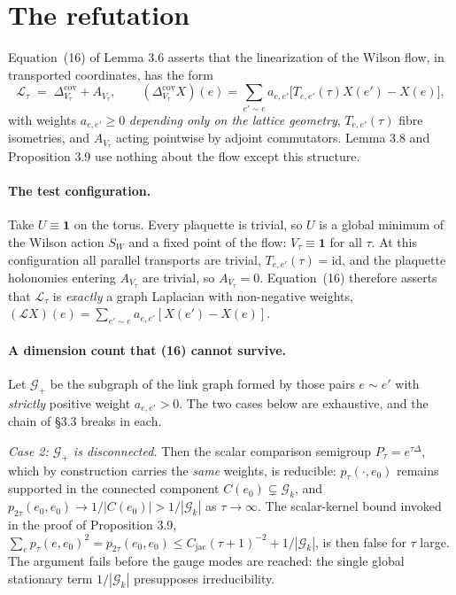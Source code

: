 \documentclass[11pt]{article}
\begin{document}
\section{The refutation}

Equation~(16) of Lemma 3.6 asserts that the linearization of the Wilson flow, in
transported coordinates, has the form
\[
\mathcal L_\tau \;=\; \Delta^{\mathrm{cov}}_{V_\tau} + A_{V_\tau},
\qquad
(\Delta^{\mathrm{cov}}_{V_\tau}X)(e)=\sum_{e'\sim e} a_{e,e'}\bigl[T_{e,e'}(\tau)X(e')-X(e)\bigr],
\]
with weights $a_{e,e'}\ge 0$ \emph{depending only on the lattice geometry}, $T_{e,e'}(\tau)$
fibre isometries, and $A_{V_\tau}$ acting pointwise by adjoint commutators. Lemma 3.8
and Proposition 3.9 use nothing about the flow except this structure.

\paragraph{The test configuration.}
Take $U\equiv \mathbf 1$ on the torus. Every plaquette is trivial, so $U$ is a global
minimum of the Wilson action $S_W$ and a fixed point of the flow: $V_\tau\equiv\mathbf 1$
for all $\tau$. At this configuration all parallel transports are trivial,
$T_{e,e'}(\tau)=\mathrm{id}$, and the plaquette holonomies entering $A_{V_\tau}$ are
trivial, so $A_{V_\tau}=0$. Equation~(16) therefore asserts that $\mathcal L_\tau$ is
\emph{exactly} a graph Laplacian with non-negative weights,
$(\mathcal L X)(e)=\sum_{e'\sim e}a_{e,e'}[X(e')-X(e)]$.

\paragraph{A dimension count that (16) cannot survive.}
Let $\mathcal G_+$ be the subgraph of the link graph formed by those pairs $e\sim e'$
with \emph{strictly} positive weight $a_{e,e'}>0$. The two cases below are exhaustive,
and the chain of \S3.3 breaks in each.

\emph{Case 2: $\mathcal G_+$ is disconnected.} Then the scalar comparison semigroup
$P_\tau=e^{\tau\Delta}$, which by construction carries the \emph{same} weights, is
reducible: $p_\tau(\cdot,e_0)$ remains supported in the connected component
$C(e_0)\subsetneq\mathcal G_k$, and $p_{2\tau}(e_0,e_0)\to 1/|C(e_0)|>1/|\mathcal G_k|$
as $\tau\to\infty$. The scalar-kernel bound invoked in the proof of Proposition 3.9,
$\sum_e p_\tau(e,e_0)^2=p_{2\tau}(e_0,e_0)\le C_{\mathrm{jac}}(\tau+1)^{-2}
+1/|\mathcal G_k|$, is then false for $\tau$ large. The argument fails before the gauge
modes are reached: the single global stationary term $1/|\mathcal G_k|$ presupposes
irreducibility.
\end{document}
